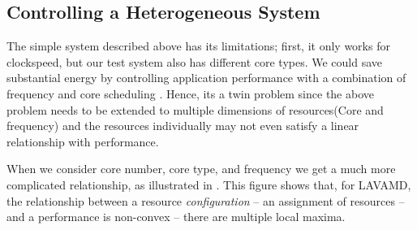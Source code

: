 \begin{figure}
  \subfloat[]
  {
    
    \label{fig:lavamd_control2}
  }
 \label{fig:learning-models}
\end{figure}


\subsection{Controlling a Heterogeneous System}
The simple system described above has its limitations;  first,
it only works for clockspeed, but our test system also has different
core types.  We could save substantial energy by controlling
application performance with a combination of frequency and core
scheduling \cite{Carroll,Imes}.  Hence, its a twin problem since the above problem needs to be extended to multiple dimensions of resources(Core and frequency) and the resources individually may not even satisfy a linear relationship with performance. 

When we consider core number, core type, and frequency we get a much
more complicated relationship, as illustrated in
.  This figure shows that, for LAVAMD, the
relationship between a resource \emph{configuration} -- \ie{} an
assignment of resources -- and a performance is non-convex -- \ie{} there are multiple local maxima.  


